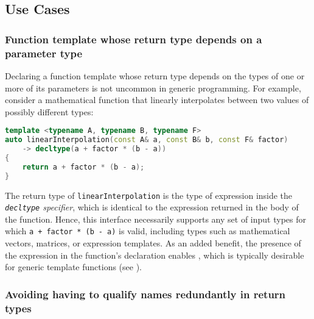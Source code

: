 \subsection[Use Cases]{Use Cases}\label{use-cases}

\subsubsection[Function template whose return type depends on a parameter type]{Function template whose return type depends on a parameter type}\label{function-template-whose-return-type-depends-on-a-parameter-type}

Declaring a function template whose return type depends on the types of
one or more of its parameters is not uncommon in generic programming.
For example, consider a mathematical function that linearly interpolates
between two values of possibly different types:

\begin{lstlisting}[language=C++]
template <typename A, typename B, typename F>
auto linearInterpolation(const A& a, const B& b, const F& factor)
    -> decltype(a + factor * (b - a))
{
    return a + factor * (b - a);
}
\end{lstlisting}
    
\noindent The return type of \lstinline!linearInterpolation! is the type of
expression inside the \emph{\lstinline!decltype! specifier}, which is
identical to the expression returned in the body of the function. Hence,
this interface necessarily supports any set of input types for which
\lstinline!a!~\lstinline!+!~\lstinline!factor!~\lstinline!*!~\lstinline!(b!~\lstinline!-!~\lstinline!a)!
is valid, including types such as mathematical vectors, matrices, or
expression templates. As an added benefit, the presence of the
expression in the function's declaration enables , which is typically desirable for generic template functions
(see %
).

\subsubsection[Avoiding having to qualify names redundantly in return types]{Avoiding having to qualify names redundantly in return types}\label{avoiding-having-to-qualify-names-redundantly-in-return-types}


